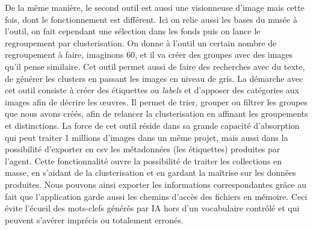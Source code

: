 De la même manière, le second outil est aussi une visionneuse d'image mais cette fois, dont le fonctionnement est différent. Ici on relie aussi les bases du musée à l'outil, on fait cependant une sélection dans les fonds puis on lance le regroupement par clusterisation. On donne à l'outil un certain nombre de regroupement à faire, imaginons 60, et il va créer des groupes avec des images qu'il pense similaire. Cet outil permet aussi de faire des recherches avec du texte, de générer les clusters en passant les images en niveau de gris. La démarche avec cet outil consiste à créer des étiquettes ou \textit{labels} et d'apposer des catégories aux images afin de décrire les œuvres. Il permet de trier, grouper ou filtrer les groupes que nous avons créés, afin de relancer la clusterisation en affinant les groupements et distinctions. La force de cet outil réside dans sa grande capacité d'absorption qui peut traiter 1 millions d'images dans un même projet, mais aussi dans la possibilité d'exporter en csv les métadonnées (les étiquettes) produites par l'agent. Cette fonctionnalité ouvre la possibilité de traiter les collections en masse, en s'aidant de la clusterisation et en gardant la maîtrise sur les données produites. Nous pouvons ainsi exporter les informations correspondantes grâce au fait que l'application garde aussi les chemins d'accès des fichiers en mémoire. Ceci évite l'écueil des mots-clefs générés par IA hors d'un vocabulaire contrôlé et qui peuvent s'avérer imprécis ou totalement erronés.


